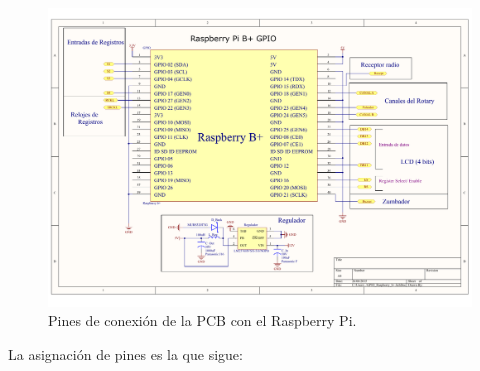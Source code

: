 \begin{figure}[H]
	\noindent \begin{centering}
		\includegraphics[width=\linewidth]{capitulo3/pcb_gpio}
		\par\end{centering}
	\smallskip
	\caption{\label{fig:pcb_gpio} Pines de conexión de la PCB con el Raspberry Pi.}
\end{figure}

\smallskip

La asignación de pines es la que sigue:

\smallskip

